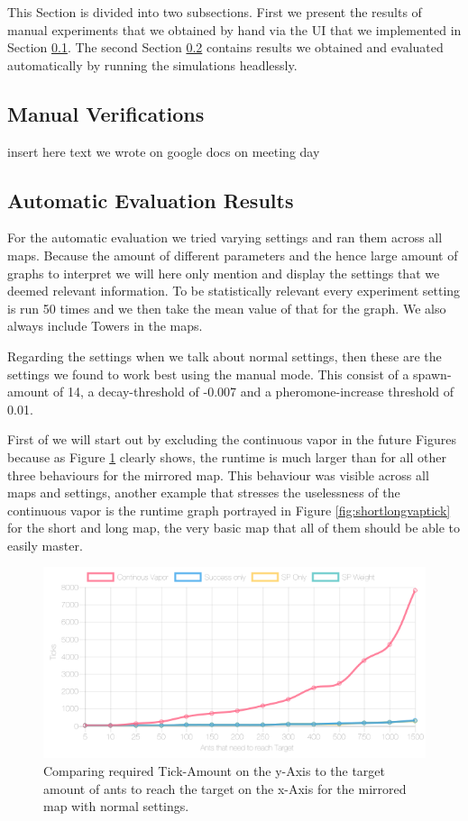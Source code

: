 This Section is divided into two subsections. First we present the results of manual experiments that we obtained by hand via the UI that we implemented in Section \ref{sec:manualver}.
The second Section \ref{sec:autover} contains results we obtained and evaluated automatically by running the simulations headlessly.

\subsection{Manual Verifications}
\label{sec:manualver}
insert here text we wrote on google docs on meeting day


\subsection{Automatic Evaluation Results}
\label{sec:autover}
For the automatic evaluation we tried varying settings and ran them across all maps. Because the amount of different parameters and the hence large amount of graphs to interpret we will here only mention and display the settings that we deemed relevant information. To be statistically relevant every experiment setting is run 50 times and we then take the mean value of that for the graph. We also always include Towers in the maps.

Regarding the settings when we talk about normal settings, then these are the settings we found to work best using the manual mode. This consist of a spawn-amount of 14, a decay-threshold of -0.007 and a pheromone-increase threshold of 0.01.

First of we will start out by excluding the continuous vapor in the future Figures because as Figure \ref{fig:mirrorvaptick} clearly shows, the runtime is much larger than for all other three behaviours for the mirrored map. This behaviour was visible across all maps and settings, another example that stresses the uselessness of the continuous vapor is the runtime graph portrayed in Figure \ref{fig:shortlongvaptick} for the short and long map, the very basic map that all of them should be able to easily master.

\begin{figure}[H]
  \centering
  \includegraphics[width=1\linewidth]{images/normalmirroredwithtower-ticks-line}
  \caption{Comparing required Tick-Amount on the y-Axis to the target amount of ants to reach the target on the x-Axis for the mirrored map with normal settings.}
  \label{fig:mirrorvaptick}
\end{figure}

